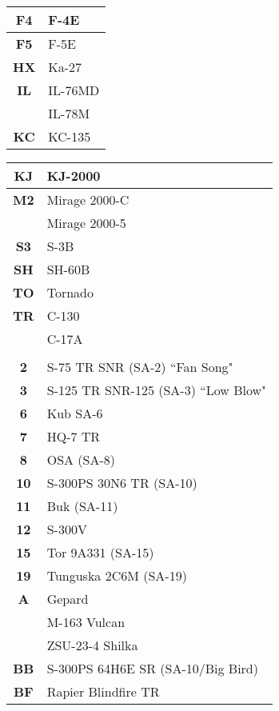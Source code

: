 \documentclass[fontSpartan]{TechCheck}
\begin{document}
\begin{multicols*}{2}
\begin{center}
\begin{tabular}{c | p{4cm}}
			\midrule
			\textbf{F4} & F-4E \\
			\midrule
			\textbf{F5} & F-5E \\
			\midrule
			\textbf{HX} & Ka-27 \\
			\midrule
			\textbf{IL} & IL-76MD \\
			& IL-78M \\
			\midrule
			\textbf{KC} & KC-135 \\
			\midrule
		\end{tabular}
	\end{center}
	\begin{center}
		\begin{tabular}{c | p{4cm}}
			\textbf{KJ} & KJ-2000 \\
			\midrule
			\textbf{M2} & Mirage 2000-C \\
			& Mirage 2000-5 \\
			\midrule
			\textbf{S3} & S-3B \\
			\midrule
			\textbf{SH} & SH-60B \\
			\midrule
			\textbf{TO} & Tornado \\
			\midrule
			\textbf{TR} & C-130 \\
			& C-17A \\
			\toprule
			\multicolumn{2}{c}{\blue{AIR DEFENSE}} \\
			\toprule
			\textbf{2} & S-75 TR SNR (SA-2) ``Fan Song" \\
			\midrule
			\textbf{3} & S-125 TR SNR-125 (SA-3) ``Low Blow" \\
			\midrule
			\textbf{6} & Kub SA-6 \\
			\midrule
			\textbf{7} & HQ-7 TR \\
			\midrule
			\textbf{8} & OSA (SA-8) \\
			\midrule
			\textbf{10} & S-300PS 30N6 TR (SA-10) \\
			\midrule
			\textbf{11} & Buk (SA-11) \\
			\midrule
			\textbf{12} & S-300V \\
			\midrule
			\textbf{15} & Tor 9A331 (SA-15) \\
			\midrule
			\textbf{19} & Tunguska 2C6M (SA-19) \\
			\midrule
			\textbf{A} & Gepard \\
			& M-163 Vulcan \\
			& ZSU-23-4 Shilka \\
			\midrule
			\textbf{BB} & S-300PS 64H6E SR (SA-10/Big Bird) \\
			\midrule
			\textbf{BF} & Rapier Blindfire TR \\

\end{tabular}
\end{center}
\end{multicols*}
\end{document}
